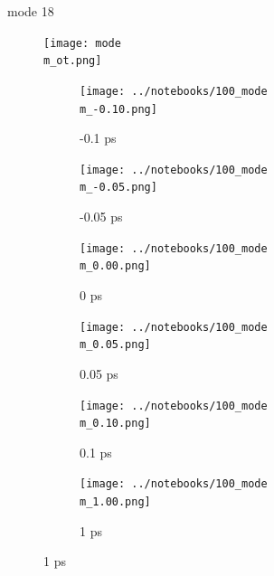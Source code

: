 \documentclass{beamer}
\newcommand\w{0.32}
\begin{document}
\renewcommand\m{18}
\begin{frame}{mode \m}
				\vspace{\vh mm}
	\begin{figure}
		\centering
		\texttt{[image: mode\\m\_ot.png]}
	\end{figure}
	\begin{figure}
		\centering
		\begin{subfigure}[b]{\w\textwidth}
			\centering
			\texttt{[image: ../notebooks/100\_mode\\m\_-0.10.png]}
			\caption{-0.1 ps}
		\end{subfigure}
		\begin{subfigure}[b]{\w\textwidth}
			\centering
			\texttt{[image: ../notebooks/100\_mode\\m\_-0.05.png]}
			\caption{-0.05 ps}
		\end{subfigure}
		\begin{subfigure}[b]{\w\textwidth}
			\centering
			\texttt{[image: ../notebooks/100\_mode\\m\_0.00.png]}
			\caption{0 ps}
		\end{subfigure}
		\begin{subfigure}[b]{\w\textwidth}
			\centering
			\texttt{[image: ../notebooks/100\_mode\\m\_0.05.png]}
			\caption{0.05 ps}
		\end{subfigure}
		\begin{subfigure}[b]{\w\textwidth}
			\centering
			\texttt{[image: ../notebooks/100\_mode\\m\_0.10.png]}
			\caption{0.1 ps}
		\end{subfigure}
		\begin{subfigure}[b]{\w\textwidth}
			\centering
			\texttt{[image: ../notebooks/100\_mode\\m\_1.00.png]}
			\caption{1 ps}
		\end{subfigure}
	\end{figure}
\end{frame}
\end{document}
